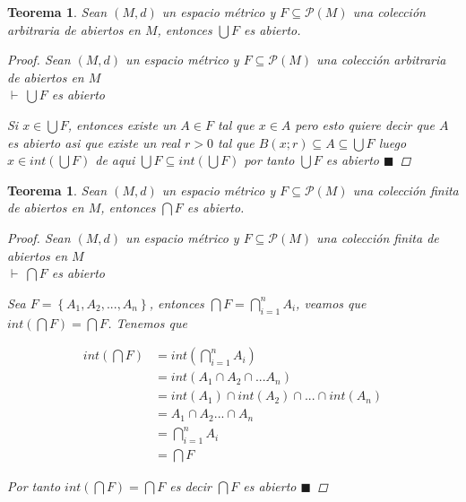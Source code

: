\documentclass[oneside]{book} %
\theoremstyle{Teorema}
\newtheorem{Teorema}[Definicion]{Teorema}
\theoremstyle{Ejemplos}
\theoremstyle{[Obs]}
\renewcommand{\{}{\left\lbrace} %
\renewcommand{\}}{\right\rbrace} %
\newcommand{\n}{\cap} %
\newcommand{\U}{\bigcup} %
\newcommand{\N}{\bigcap} %
\renewcommand{\sc}{\subseteq} %
\renewcommand{\P}{\mathcal{P}} %
\renewcommand{\qed}{$\blacksquare$} %
\newcommand{\pd}{$\vdash\ $} %
\begin{document}
			\begin{Teorema}\setlength{\parindent}{0em}

				Sean $(M, d)$ un espacio métrico y $F \sc \P(M)$ una colección arbitraria de abiertos en $M$, entonces $\U F$ es abierto.

				\begin{proof}
					
					Sean $(M, d)$ un espacio métrico y $F \sc \P(M)$ una colección arbitraria de abiertos en $M$ \\ 
					\pd $\U F$ es abierto

					Si $x \in \U F$, entonces existe un $A \in F$ tal que $x \in A$ pero esto quiere decir que $A$ es abierto asi que existe un real $r > 0$ tal que $B(x;r) \sc A \sc \U F$ luego $x \in int(\U F)$ de aqui $\U F \sc int(\U F)$ por tanto $\U F$ es abierto \qed

				\end{proof}

			\end{Teorema}

			\begin{Teorema}\setlength{\parindent}{0em}

				Sean $(M, d)$ un espacio métrico y $F \sc \P(M)$ una colección finita de abiertos en $M$, entonces $\N F$ es abierto.

				\begin{proof}
					
					Sean $(M, d)$ un espacio métrico y $F \sc \P(M)$ una colección finita de abiertos en $M$ \\
					\pd $\N F$ es abierto

					Sea $F = \{ A_1, A_2, ..., A_n \}$, entonces $\N F = \N_{i = 1}^{n} A_i$, veamos que $int(\N F) = \N F$. Tenemos que

					\begin{align*}
						int\left( \N F \right) &= int\left( \N_{i = 1}^{n} A_i \right) \\ 
						&= int\left( A_1 \n A_2 \n ... A_n \right) \\ 
						&= int(A_1) \n int(A_2) \n ... \n int(A_n) \\
						&= A_1 \n A_2 ... \n A_n \\ 
						&= \N_{i = 1}^{n} A_i \\
						&= \N F
					\end{align*}

					Por tanto $int(\N F) = \N F$ es decir $\N F$ es abierto \qed

				\end{proof}

			\end{Teorema}
\end{document}
